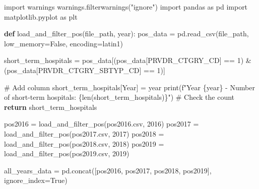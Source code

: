 \documentclass[
  letterpaper,
  DIV=11,
  numbers=noendperiod]{scrartcl}
\newenvironment{Shaded}{\begin{snugshade}}{\end{snugshade}}
\newcommand{\BuiltInTok}[1]{\textcolor[rgb]{0.00,0.23,0.31}{#1}}
\newcommand{\CommentTok}[1]{\textcolor[rgb]{0.37,0.37,0.37}{#1}}
\newcommand{\ControlFlowTok}[1]{\textcolor[rgb]{0.00,0.23,0.31}{\textbf{#1}}}
\newcommand{\DecValTok}[1]{\textcolor[rgb]{0.68,0.00,0.00}{#1}}
\newcommand{\ImportTok}[1]{\textcolor[rgb]{0.00,0.46,0.62}{#1}}
\newcommand{\KeywordTok}[1]{\textcolor[rgb]{0.00,0.23,0.31}{\textbf{#1}}}
\newcommand{\NormalTok}[1]{\textcolor[rgb]{0.00,0.23,0.31}{#1}}
\newcommand{\OperatorTok}[1]{\textcolor[rgb]{0.37,0.37,0.37}{#1}}
\newcommand{\SpecialCharTok}[1]{\textcolor[rgb]{0.37,0.37,0.37}{#1}}
\newcommand{\SpecialStringTok}[1]{\textcolor[rgb]{0.13,0.47,0.30}{#1}}
\newcommand{\StringTok}[1]{\textcolor[rgb]{0.13,0.47,0.30}{#1}}
\newcommand{\VariableTok}[1]{\textcolor[rgb]{0.07,0.07,0.07}{#1}}
\begin{document}
\begin{Shaded}
\begin{Highlighting}[]
\ImportTok{import}\NormalTok{ warnings}
\NormalTok{warnings.filterwarnings(}\StringTok{"ignore"}\NormalTok{)}
\ImportTok{import}\NormalTok{ pandas }\ImportTok{as}\NormalTok{ pd}
\ImportTok{import}\NormalTok{ matplotlib.pyplot }\ImportTok{as}\NormalTok{ plt}


\KeywordTok{def}\NormalTok{ load\_and\_filter\_pos(file\_path, year):}
\NormalTok{    pos\_data }\OperatorTok{=}\NormalTok{ pd.read\_csv(file\_path, low\_memory}\OperatorTok{=}\VariableTok{False}\NormalTok{, encoding}\OperatorTok{=}\StringTok{\textquotesingle{}latin1\textquotesingle{}}\NormalTok{)}
    
\NormalTok{    short\_term\_hospitals }\OperatorTok{=}\NormalTok{ pos\_data[(pos\_data[}\StringTok{\textquotesingle{}PRVDR\_CTGRY\_CD\textquotesingle{}}\NormalTok{] }\OperatorTok{==} \DecValTok{1}\NormalTok{) }\OperatorTok{\&} 
\NormalTok{                                    (pos\_data[}\StringTok{\textquotesingle{}PRVDR\_CTGRY\_SBTYP\_CD\textquotesingle{}}\NormalTok{] }\OperatorTok{==} \DecValTok{1}\NormalTok{)]}
    
    \CommentTok{\# Add column }
\NormalTok{    short\_term\_hospitals[}\StringTok{\textquotesingle{}Year\textquotesingle{}}\NormalTok{] }\OperatorTok{=}\NormalTok{ year}
    \BuiltInTok{print}\NormalTok{(}\SpecialStringTok{f"Year }\SpecialCharTok{\{}\NormalTok{year}\SpecialCharTok{\}}\SpecialStringTok{ {-} Number of short{-}term hospitals: }\SpecialCharTok{\{}\BuiltInTok{len}\NormalTok{(short\_term\_hospitals)}\SpecialCharTok{\}}\SpecialStringTok{"}\NormalTok{)  }\CommentTok{\# Check the count}
    \ControlFlowTok{return}\NormalTok{ short\_term\_hospitals}

\NormalTok{pos2016 }\OperatorTok{=}\NormalTok{ load\_and\_filter\_pos(}\StringTok{\textquotesingle{}pos2016.csv\textquotesingle{}}\NormalTok{, }\DecValTok{2016}\NormalTok{)}
\NormalTok{pos2017 }\OperatorTok{=}\NormalTok{ load\_and\_filter\_pos(}\StringTok{\textquotesingle{}pos2017.csv\textquotesingle{}}\NormalTok{, }\DecValTok{2017}\NormalTok{)}
\NormalTok{pos2018 }\OperatorTok{=}\NormalTok{ load\_and\_filter\_pos(}\StringTok{\textquotesingle{}pos2018.csv\textquotesingle{}}\NormalTok{, }\DecValTok{2018}\NormalTok{)}
\NormalTok{pos2019 }\OperatorTok{=}\NormalTok{ load\_and\_filter\_pos(}\StringTok{\textquotesingle{}pos2019.csv\textquotesingle{}}\NormalTok{, }\DecValTok{2019}\NormalTok{)}

\NormalTok{all\_years\_data }\OperatorTok{=}\NormalTok{ pd.concat([pos2016, pos2017, pos2018, pos2019], ignore\_index}\OperatorTok{=}\VariableTok{True}\NormalTok{)}


\end{Highlighting}
\end{Shaded}
\end{document}

